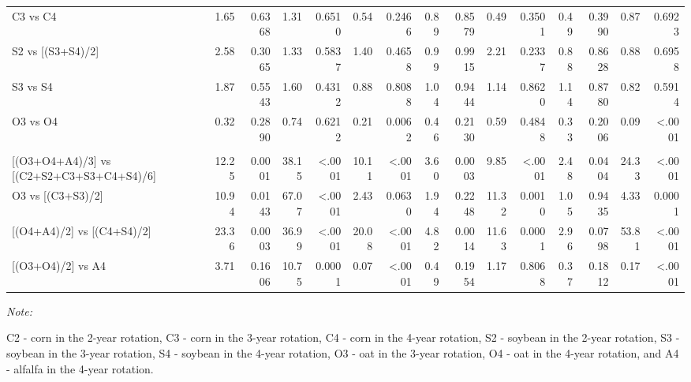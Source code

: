 \documentclass[
]{article}
\begin{document}
\begin{landscape}
\begin{table}
{\begin{threeparttable}
\begin{tabular}[t]{lr>{}r|r>{}r|r>{}r|r>{}r|r>{}r|r>{}r|rr}
\hspace{1em}C3 vs C4 & 1.65 & 0.6368 & 1.31 & 0.6510 & 0.54 & 0.2466 & 0.89 & 0.8579 & 0.49 & 0.3501 & 0.49 & 0.3990 & 0.87 & 0.6923\\
\hspace{1em}S2 vs [(S3+S4)/2] & 2.58 & 0.3065 & 1.33 & 0.5837 & 1.40 & 0.4658 & 0.99 & 0.9915 & 2.21 & 0.2337 & 0.88 & 0.8628 & 0.88 & 0.6958\\
\hspace{1em}S3 vs S4 & 1.87 & 0.5543 & 1.60 & 0.4312 & 0.88 & 0.8088 & 1.04 & 0.9444 & 1.14 & 0.8620 & 1.14 & 0.8780 & 0.82 & 0.5914\\
\hspace{1em}O3 vs O4 & 0.32 & 0.2890 & 0.74 & 0.6212 & 0.21 & 0.0062 & 0.46 & 0.2130 & 0.59 & 0.4848 & 0.33 & 0.2006 & 0.09 & <.0001\\
\addlinespace[0.3em]
\multicolumn{15}{l}{\textbf{(C) - Crop type effects}}\\
\hspace{1em}{}[(O3+O4+A4)/3] vs [(C2+S2+C3+S3+C4+S4)/6] & 12.25 & 0.0001 & 38.15 & <.0001 & 10.11 & <.0001 & 3.60 & 0.0003 & 9.85 & <.0001 & 2.48 & 0.0404 & 24.33 & <.0001\\
\hspace{1em}O3 vs [(C3+S3)/2] & 10.94 & 0.0143 & 67.07 & <.0001 & 2.43 & 0.0630 & 1.94 & 0.2248 & 11.32 & 0.0010 & 1.05 & 0.9435 & 4.33 & 0.0001\\
\hspace{1em}{}[(O4+A4)/2] vs [(C4+S4)/2] & 23.36 & 0.0003 & 36.99 & <.0001 & 20.08 & <.0001 & 4.82 & 0.0014 & 11.63 & 0.0001 & 2.96 & 0.0798 & 53.81 & <.0001\\
\hspace{1em}{}[(O3+O4)/2] vs A4 & 3.71 & 0.1606 & 10.75 & 0.0001 & 0.07 & <.0001 & 0.49 & 0.1954 & 1.17 & 0.8068 & 0.37 & 0.1812 & 0.17 & <.0001\\
\bottomrule
\end{tabular}
\begin{tablenotes}[para]
\item \textit{Note: } 
\item C2 - corn in the 2-year rotation, C3 - corn in the 3-year rotation, C4 - corn in the 4-year rotation, S2 - soybean in the 2-year rotation, S3 - soybean in the 3-year rotation, S4 - soybean in the 4-year rotation, O3 - oat in the 3-year rotation, O4 - oat in the 4-year rotation, and A4 - alfalfa in the 4-year rotation.
\end{tablenotes}
\end{threeparttable}}
\end{table}
\end{landscape}
\end{document}
